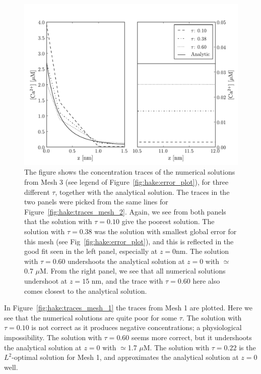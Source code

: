 \begin{figure}
  \center
  \includegraphics[width=\largefig]{chapters/hake/pdf/traces_mesh_3}
  \caption[Concentration traces 3]{The figure shows the
    concentration traces of the numerical solutions from Mesh 3 (see
    legend of Figure~\ref{fig:hake:error_plot}), for three different
    $\tau$, together with the analytical solution. The traces in the
    two panels were picked from the same lines for
    Figure~\ref{fig:hake:traces_mesh_2}. Again, we see from both
    panels that the solution with $\tau=0.10$ give the poorest
    solution. The solution with $\tau=0.38$ was the solution with
    smallest global error for this mesh (see
    Fig~\ref{fig:hake:error_plot}), and this is reflected in the
    good fit seen in the left panel, especially at $z=0$nm. The
    solution with $\tau=0.60$ undershoots the analytical solution at
    $z=0$ with $\simeq$0.7 $\mu$M. From the right panel, we see that
    all numerical solutions undershoot at $z=15$ nm, and the trace
    with $\tau=0.60$ here also comes closest to the analytical
    solution.}
  \label{fig:hake:traces_mesh_3}
\end{figure}

In Figure~\ref{fig:hake:traces_mesh_1} the traces from Mesh 1 are
plotted. Here we see that the numerical solutions are quite poor for
some $\tau$. The solution with $\tau=0.10$ is not correct as it
produces negative concentrations; a physiological impossibility. The
solution with $\tau=0.60$ seems more correct, but it undershoots the
analytical solution at $z=0$ with $\simeq$1.7 $\mu$M. The solution with
$\tau=0.22$ is the $L^2$-optimal solution for Mesh 1, and approximates
the analytical solution at $z=0$ well.

